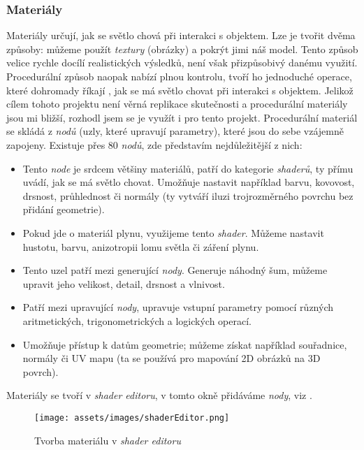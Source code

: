 \subsubsection{Materiály}
{Materiály určují, jak se světlo chová při interakci s objektem.}\odst
{Lze je tvořit dvěma způsoby: můžeme použít \textit{textury} (obrázky) a pokrýt jimi náš model. Tento způsob velice rychle docílí realistických výsledků, není však přizpůsobivý danému využití. Procedurální způsob naopak nabízí plnou kontrolu, tvoří ho jednoduché operace, které dohromady říkají , jak se má světlo chovat při interakci s objektem.}\odst
{Jelikož cílem tohoto projektu není věrná replikace skutečnosti a procedurální materiály jsou mi bližší, rozhodl jsem se je využít i pro tento projekt. Procedurální materiál se skládá z \textit{nodů} (uzly, které upravují parametry), které jsou do sebe vzájemně zapojeny. Existuje přes 80 \textit{nodů}, zde představím nejdůležitější z nich:}
\begin{itemize}
    \item {}\par
        {Tento \textit{node} je srdcem většiny materiálů, patří do kategorie \textit{shaderů}, ty přímu uvádí, jak se má světlo chovat. Umožňuje nastavit například barvu, kovovost, drsnost, průhlednost či normály (ty vytváří iluzi trojrozměrného povrchu bez přidání geometrie).}
    \item {}\par
        {Pokud jde o materiál plynu, využijeme tento \textit{shader}. Můžeme nastavit hustotu, barvu, anizotropii lomu světla či záření plynu.}
    \item {}\par
        {Tento uzel patří mezi generující \textit{nody}. Generuje náhodný šum, můžeme upravit jeho velikost, detail, drsnost a vlnivost.}
    \item {}\par
        {Patří mezi upravující \textit{nody}, upravuje vstupní parametry pomocí různých aritmetických, trigonometrických a logických operací.}
    \item {}\par
        {Umožňuje přístup k datům geometrie; můžeme získat například souřadnice, normály či UV mapu (ta se používá pro mapování 2D obrázků na 3D povrch).}
\end{itemize}
{Materiály se tvoří v \textit{shader editoru}, v tomto okně přidáváme \textit{nody}, viz .}
\begin{figure}[H]
    \centering
    \texttt{[image: assets/images/shaderEditor.png]}
    \caption{Tvorba materiálu v \textit{shader editoru} \jaObr}
    \label{obr:shaderEditor}
\end{figure}
\newpage
